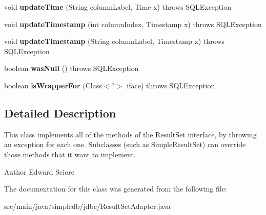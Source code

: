 \begin{DoxyCompactItemize}
\item 
\mbox{\label{classsimpledb_1_1jdbc_1_1ResultSetAdapter_afe1438fbb20c7545dd1413be855c5fed}} 
void {\bfseries update\+Time} (String column\+Label, Time x)  throws S\+Q\+L\+Exception 
\item 
\mbox{\label{classsimpledb_1_1jdbc_1_1ResultSetAdapter_a6ea0acb3a72ae9afe13f322e336d5368}} 
void {\bfseries update\+Timestamp} (int column\+Index, Timestamp x)  throws S\+Q\+L\+Exception 
\item 
\mbox{\label{classsimpledb_1_1jdbc_1_1ResultSetAdapter_a0ee4d72adfaa69b2d7db6b5614765d16}} 
void {\bfseries update\+Timestamp} (String column\+Label, Timestamp x)  throws S\+Q\+L\+Exception 
\item 
\mbox{\label{classsimpledb_1_1jdbc_1_1ResultSetAdapter_afac52e00caa00906a88bc6236d090c8f}} 
boolean {\bfseries was\+Null} ()  throws S\+Q\+L\+Exception 
\item 
\mbox{\label{classsimpledb_1_1jdbc_1_1ResultSetAdapter_a239fa029138ca718c2783f39798bd1cd}} 
boolean {\bfseries is\+Wrapper\+For} (Class$<$?$>$ iface)  throws S\+Q\+L\+Exception 
\end{DoxyCompactItemize}


\subsection{Detailed Description}
This class implements all of the methods of the Result\+Set interface, by throwing an exception for each one. Subclasses (such as Simple\+Result\+Set) can override those methods that it want to implement. \begin{DoxyAuthor}{Author}
Edward Sciore 
\end{DoxyAuthor}


The documentation for this class was generated from the following file\+:\begin{DoxyCompactItemize}
\item 
src/main/java/simpledb/jdbc/Result\+Set\+Adapter.\+java\end{DoxyCompactItemize}
